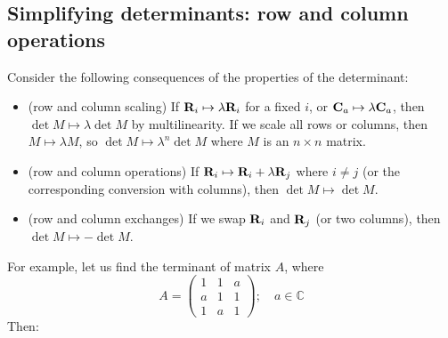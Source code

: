 \subsection{Simplifying determinants: row and column operations}
Consider the following consequences of the properties of the determinant:
\begin{itemize}
	\item (row and column scaling) If \(\vb R_i \mapsto \lambda \vb R_i\) for a fixed \(i\), or \(\vb C_a \mapsto \lambda \vb C_a\), then \(\det M \mapsto \lambda \det M\) by multilinearity.
	      If we scale all rows or columns, then \(M \mapsto \lambda M\), so \(\det M \mapsto \lambda^n \det M\) where \(M\) is an \(n \times n\) matrix.
	\item (row and column operations) If \(\vb R_i \mapsto \vb R_i + \lambda \vb R_j\) where \(i \neq j\) (or the corresponding conversion with columns), then \(\det M \mapsto \det M\).
	\item (row and column exchanges) If we swap \(\vb R_i\) and \(\vb R_j\) (or two columns), then \(\det M \mapsto -\det M\).
\end{itemize}
For example, let us find the terminant of matrix \(A\), where
\[
	A = \begin{pmatrix}
		1 & 1 & a \\ a & 1 & 1 \\ 1 & a & 1
	\end{pmatrix};\quad a \in \mathbb C
\]
Then:
